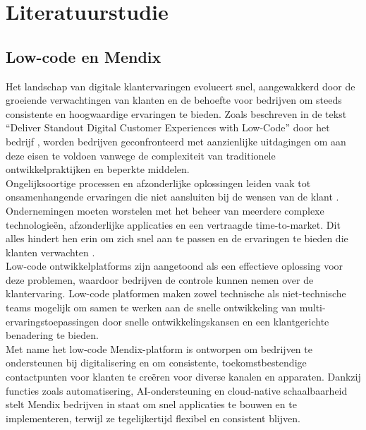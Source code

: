 
\section{Literatuurstudie}%
\label{sec:literatuurstudie}
\subsection{Low-code en Mendix}
Het landschap van digitale klantervaringen evolueert snel, aangewakkerd door de groeiende verwachtingen van klanten en de behoefte voor bedrijven om steeds consistente en hoogwaardige ervaringen te bieden. Zoals beschreven in de tekst “Deliver Standout Digital Customer Experiences with Low-Code” door het bedrijf \textcite{Mendix}, worden bedrijven geconfronteerd met aanzienlijke uitdagingen om aan deze eisen te voldoen vanwege de complexiteit van traditionele ontwikkelpraktijken en beperkte middelen.
\\
Ongelijksoortige processen en afzonderlijke oplossingen leiden vaak tot onsamenhangende ervaringen die niet aansluiten bij de wensen van de klant \autocite{Mendix2023}. Ondernemingen moeten worstelen met het beheer van meerdere complexe technologieën, afzonderlijke applicaties en een vertraagde time-to-market. Dit alles hindert hen erin om zich snel aan te passen en de ervaringen te bieden die klanten verwachten .
\\
Low-code ontwikkelplatforms zijn aangetoond als een effectieve oplossing voor deze problemen, waardoor bedrijven de controle kunnen nemen over de klantervaring. Low-code platformen maken zowel technische als niet-technische teams mogelijk om samen te werken aan de snelle ontwikkeling van multi-ervaringstoepassingen door snelle ontwikkelingskansen en een klantgerichte benadering te bieden.
\\
Met name het low-code Mendix-platform is ontworpen om bedrijven te ondersteunen bij digitalisering en om consistente, toekomstbestendige contactpunten voor klanten te creëren voor diverse kanalen en apparaten. Dankzij functies zoals automatisering, AI-ondersteuning en cloud-native schaalbaarheid stelt Mendix bedrijven in staat om snel applicaties te bouwen en te implementeren, terwijl ze tegelijkertijd flexibel en consistent blijven. ~\autocite{Mendix}

